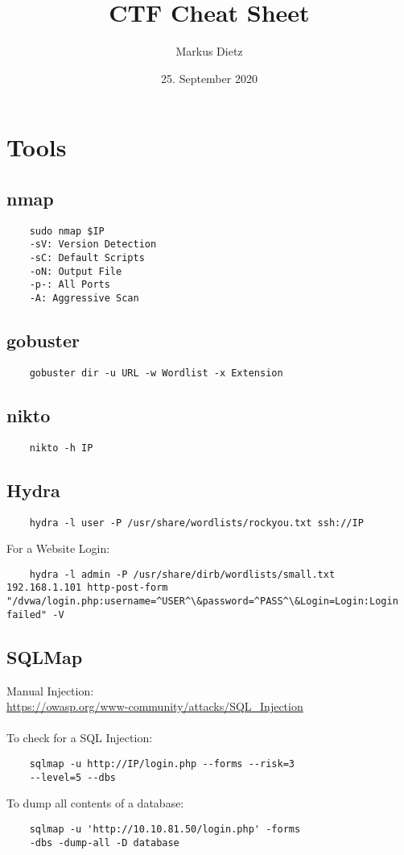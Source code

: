 \documentclass[12pt,a4paper]{scrartcl}
\title{CTF Cheat Sheet}
\author{Markus Dietz}
\date{25. September 2020}
\begin{document}
\maketitle
\tableofcontents

\section{Tools}
\subsection{nmap}
\begin{lstlisting}
	sudo nmap $IP
	-sV: Version Detection
	-sC: Default Scripts
	-oN: Output File
	-p-: All Ports
	-A: Aggressive Scan 
\end{lstlisting}

\subsection{gobuster}
\begin{lstlisting}
	gobuster dir -u URL -w Wordlist -x Extension
\end{lstlisting}

\subsection{nikto}
\begin{lstlisting}
	nikto -h IP
\end{lstlisting}

\subsection{Hydra}
\begin{lstlisting}
	hydra -l user -P /usr/share/wordlists/rockyou.txt ssh://IP
\end{lstlisting}
For a Website Login:
\begin{lstlisting}
	hydra -l admin -P /usr/share/dirb/wordlists/small.txt 192.168.1.101 http-post-form "/dvwa/login.php:username=^USER^\&password=^PASS^\&Login=Login:Login failed" -V
\end{lstlisting}

\subsection{SQLMap}
Manual Injection: \\ \url{https://owasp.org/www-community/attacks/SQL_Injection}\\\\
To check for a SQL Injection:
\begin{lstlisting}
	sqlmap -u http://IP/login.php --forms --risk=3 
	--level=5 --dbs
\end{lstlisting}
To dump all contents of a database:
\begin{lstlisting}
	sqlmap -u 'http://10.10.81.50/login.php' -forms
	-dbs -dump-all -D database
\end{lstlisting}
\end{document}
